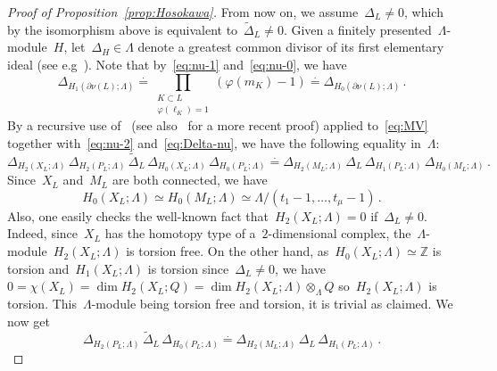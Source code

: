 \documentclass{amsart}
\newcommand{\Z}{\mathbb{Z}}
\theoremstyle{definition}
\theoremstyle{remark}
\begin{document}
\begin{proof}[Proof of Proposition~\ref{prop:Hosokawa}]
	From now on, we assume~$\Delta_L\neq 0$, which by the isomorphism above is equivalent to~$\widetilde\Delta_L\neq 0$.
	Given a finitely presented~$\Lambda$-module~$H$, let~$\Delta_H\in\Lambda$ denote a greatest common divisor
	of its first elementary ideal (see e.g~\cite[Chapter~6]{Lic97}). Note that by~\eqref{eq:nu-1} and~\eqref{eq:nu-0}, we have
	\begin{equation}
	\label{eq:Delta-nu}
	\Delta_{H_1(\partial\nu(L);\Lambda)}\stackrel{\cdot}{=}\prod_{\substack{K\subset L\\ \varphi(\ell_K)=1}}(\varphi(m_K)-1)\stackrel{\cdot}{=}\Delta_{H_0(\partial\nu(L);\Lambda)}\,.
	\end{equation}
	By a recursive use of~\cite[Lemma~5]{Lev67} (see also~\cite[Lemma~7.2.7]{Kau96} for a more recent proof)
	applied to~\eqref{eq:MV} together with~\eqref{eq:nu-2} and~\eqref{eq:Delta-nu},
	we have the following equality in~$\Lambda$:
	\begin{equation*}
	\Delta_{H_2(X_L;\Lambda)}\,\Delta_{H_2(P_L;\Lambda)}\,\widetilde{\Delta}_L\,\Delta_{H_0(X_L;\Lambda)}\,\Delta_{H_0(P_L;\Lambda)}\stackrel{\cdot}{=}
	\Delta_{H_2(M_L;\Lambda)}\,\Delta_L\,\Delta_{H_1(P_L;\Lambda)}\,\Delta_{H_0(M_L;\Lambda)}\,.
	\end{equation*}
	Since~$X_L$ and~$M_L$ are both connected, we have
	\[
	H_0(X_L;\Lambda)\simeq H_0(M_L;\Lambda)\simeq\Lambda/(t_1-1,\dots,t_\mu-1)\,.
	\]
	Also, one easily checks the well-known fact that~$H_2(X_L;\Lambda)=0$ if~$\Delta_L\neq 0$. Indeed, since~$X_L$ has the homotopy
	type of a~$2$-dimensional complex, the~$\Lambda$-module~$H_2(X_L;\Lambda)$ is torsion free.
	On the other hand, as~$H_0(X_L;\Lambda)\simeq\Z$ is torsion and~$H_1(X_L;\Lambda)$ is torsion since~$\Delta_L\neq 0$, we have~$0=\chi(X_L)=\dim H_2(X_L;Q)=\dim H_2(X_L;\Lambda)\otimes_\Lambda Q$ so~$H_2(X_L;\Lambda)$ is torsion. This~$\Lambda$-module being torsion free and torsion, it is trivial as claimed.
	 We now get
	\begin{equation}
		\label{eq:Delta}
	\Delta_{H_2(P_L;\Lambda)}\,\widetilde{\Delta}_L\,\Delta_{H_0(P_L;\Lambda)}\stackrel{\cdot}{=}
	\Delta_{H_2(M_L;\Lambda)}\,\Delta_L\,\Delta_{H_1(P_L;\Lambda)}\,.
	\end{equation}
	

\end{proof}
\end{document}
